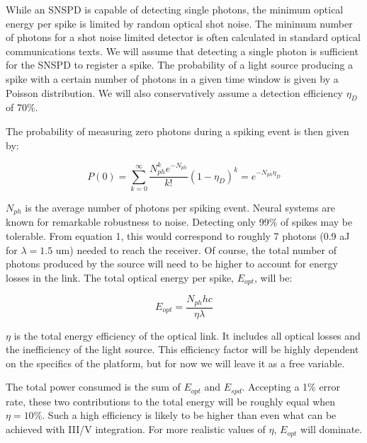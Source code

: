 \documentclass[twocolumn]{article}
\begin{document}
While an SNSPD is capable of detecting single photons, the minimum optical energy per spike is limited by random optical shot noise. The minimum number of photons for a shot noise limited detector is often calculated in standard optical communications texts. We will assume that detecting a single photon is sufficient for the SNSPD to register a spike. The probability of a light source producing a spike with a certain number of photons in a given time window is given by a Poisson distribution. We will also conservatively assume a detection efficiency $\eta_D$ of 70\%.

The probability of measuring zero photons during a spiking event is then given by: \newline

\begin{equation}
    P(0) = \sum_{k=0}^{\infty} \frac{N_{ph}^k e^{-N_{ph}}}{k!}(1-\eta_D)^{k} = e^{-N_{ph}\eta_D}
\end{equation}

$N_{ph}$ is the average number of photons per spiking event. Neural systems are known for remarkable robustness to noise. Detecting only 99\% of spikes may be tolerable. From equation 1, this would correspond to roughly 7 photons (0.9 aJ for $\lambda = 1.5$ um) needed to reach the receiver. Of course, the total number of photons produced by the source will need to be higher to account for energy losses in the link. The total optical energy per spike, $E_{opt}$, will be:

\begin{equation}
    E_{opt} = \frac{N_{ph} h c}{\eta\lambda}
\end{equation}

$\eta$ is the total energy efficiency of the optical link. It includes all optical losses and the inefficiency of the light source. This efficiency factor will be highly dependent on the specifics of the platform, but for now we will leave it as a free variable.

The total power consumed is the sum of $E_{opt}$ and $E_{spd}$. Accepting a 1\% error rate, these two contributions to the total energy will be roughly equal when $\eta = 10\%$. Such a high efficiency is likely to be higher than even what can be achieved with III/V integration. For more realistic values of $\eta$, $E_{opt}$ will dominate.
\end{document}
